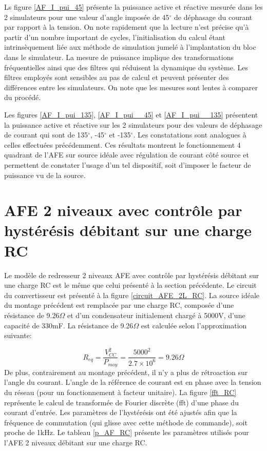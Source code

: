 Ls figure \ref{AF_I_pui_45} présente la puissance active et réactive mesurée dans les 2 simulateurs pour une valeur d'angle imposée de 45$^\circ$ de déphasage du courant par rapport à la tension. On note rapidement que la lecture n'est précise qu'à partir d'un nombre important de cycles, l'initialisation du calcul étant intrinsèquement liée aux méthode de simulation jumelé à l'implantation du bloc dans le simulateur. La mesure de puissance implique des transformations fréquentielles ainsi que des filtres qui réduisent la dynamique du système. Les filtres employés sont sensibles au pas de calcul et peuvent présenter des différences entre les simulateurs. On note que les mesures sont lentes à comparer du procédé.

Les figures \ref{AF_I_pui_135}, \ref{AF_I_pui__45} et \ref{AF_I_pui__135} présentent la puissance active et réactive sur les 2 simulateurs pour des valeurs de déphasage de courant qui sont de 135$^\circ$, -45$^\circ$ et -135$^\circ$. Les constatations sont analogues à celles effectuées précédemment. Ces résultats montrent le fonctionnement 4 quadrant de l'AFE sur source idéale avec régulation de courant côté source et permettent de constater l'usage d'un tel dispositif, soit d'imposer le facteur de puissance vu de la source. 
\section{AFE 2 niveaux avec contrôle par hystérésis débitant sur une charge RC}
Le modèle de redresseur 2 niveaux AFE avec contrôle par hystérésis débitant sur une charge RC est le même que celui présenté à la section précédente. Le circuit du convertisseur est présenté à la figure \ref{circuit_AFE_2L_RC}. La source idéale du montage précédent est remplacée par une charge RC, composée d'une résistance de 9.26$\Omega$ et d'un condensateur initialement chargé à 5000V, d'une capacité de 330mF. La résistance de 9.26$\Omega$ est calculée selon l'approximation suivante:

\begin{equation}
R_{eq} = \frac{V_{CC}^2}{P_{moy}} = \frac{5000^2}{2.7 \times 10^6} = 9.26\Omega
\end{equation}
De plus, contrairement au montage précédent, il n'y a plus de rétroaction sur l'angle du courant. L'angle de la référence de courant est en phase avec la tension du réseau (pour un fonctionnement à facteur unitaire). La figure \ref{fft_RC} représente le calcul de transformée de Fourier discrète (fft) d'une phase du courant d'entrée. Les paramètres de l'hystérésis ont été ajustés afin que la fréquence de commutation (qui glisse avec cette méthode de commande), soit proche de 1kHz. Le tableau \ref{p_AF_RC} présente les paramètres utilisés pour l'AFE 2 niveaux débitant sur une charge RC.

